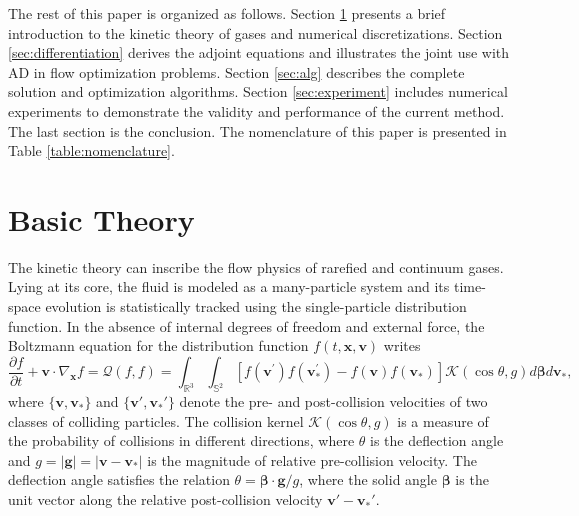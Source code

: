 \documentclass[preprint,3p,12pt,sort&compress]{elsarticle}
\begin{document}
The rest of this paper is organized as follows. 
Section \ref{sec:theory} presents a brief introduction to the kinetic theory of gases and numerical discretizations.
Section \ref{sec:differentiation} derives the adjoint equations and illustrates the joint use with AD in flow optimization problems.
Section \ref{sec:alg} describes the complete solution and optimization algorithms.
Section \ref{sec:experiment} includes numerical experiments to demonstrate the validity and performance of the current method. 
The last section is the conclusion.
The nomenclature of this paper is presented in Table \ref{table:nomenclature}.

\section{Basic Theory}\label{sec:theory}

The kinetic theory can inscribe the flow physics of rarefied and continuum gases.
Lying at its core, the fluid is modeled as a many-particle system and its time-space evolution is statistically tracked using the single-particle distribution function.
In the absence of internal degrees of freedom and external force, the Boltzmann equation for the distribution function $f(t,\mathbf x,\mathbf v)$ writes
\begin{equation}
    \frac{\partial f}{\partial t} + \mathbf v \cdot \nabla_\mathbf x f = \mathcal Q(f,f) = \int_{\mathbb{R}^{3}} \int_{\mathbb S^{2}}\left[f\left(\mathbf{v}^{\prime}\right) f\left(\mathbf{v}_{*}^{\prime}\right)-f(\mathbf{v}) f\left(\mathbf{v}_{*}\right)\right] \mathcal{K}(\cos \theta, g) d \boldsymbol\beta d \mathbf{v}_{*},
\label{eq:boltz}
\end{equation}
where $\{\mathbf v, \mathbf v_*\}$ and $\{\mathbf v', \mathbf v_*'\}$ denote the pre- and post-collision velocities of two classes of colliding particles.
The collision kernel $\mathcal{K}(\cos \theta, g)$ is a measure of the probability of collisions in different directions, where $\theta$ is the deflection angle and $g = |\mathbf g| = |\mathbf v - \mathbf v_*|$ is the magnitude of relative pre-collision velocity.
The deflection angle satisfies the relation $\theta=\boldsymbol\beta \cdot \mathbf g / g$, where the solid angle $\boldsymbol\beta$ is the unit vector along the relative post-collision velocity $\mathbf v' - \mathbf v_*'$.
\end{document}
